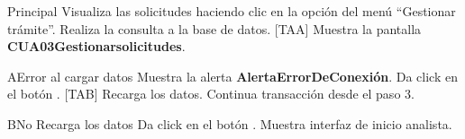 \begin{UCtrayectoria}{Principal}
  \UCpaso[\UCactor] Visualiza las solicitudes haciendo clic en la opción del menú ``Gestionar trámite”.
  \UCpaso Realiza la consulta a la base de datos. [TAA]
  \UCpaso Muestra la pantalla  {\bf CUA03Gestionarsolicitudes}.
\end{UCtrayectoria}

\begin{UCtrayectoriaA}{A}{Error al cargar datos} 
\UCpaso Muestra la alerta {\bf AlertaErrorDeConexión}.
  \UCpaso[\UCactor] Da click en el botón . [TAB]
  \UCpaso Recarga los datos.
  \UCpaso Continua transacción desde el paso 3.
\end{UCtrayectoriaA}

\begin{UCtrayectoriaA}{B}{No Recarga los datos} 
  \UCpaso Da click en el botón .
  \UCpaso Muestra interfaz de inicio analista.
\end{UCtrayectoriaA}

